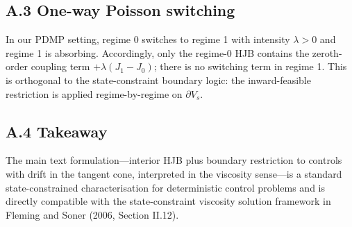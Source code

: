 \begin{appendix}
\subsection*{A.3 One-way Poisson switching}
In our PDMP setting, regime 0 switches to regime 1 with intensity $\lambda>0$ and regime 1 is absorbing. Accordingly, only the
regime-0 HJB contains the zeroth-order coupling term $+\lambda(J_1-J_0)$; there is no switching term in regime 1. This is orthogonal
to the state-constraint boundary logic: the inward-feasible restriction is applied regime-by-regime on $\partial V_s$.

\subsection*{A.4 Takeaway}
The main text formulation—interior HJB plus boundary restriction to controls with drift in the tangent cone, interpreted in the
viscosity sense—is a standard state-constrained characterisation for deterministic control problems and is directly compatible with
the state-constraint viscosity solution framework in Fleming and Soner (2006, Section II.12).

\end{appendix}